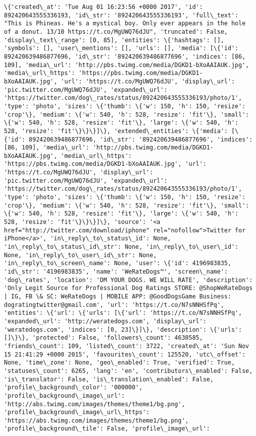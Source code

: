 \documentclass[11pt]{article}
\begin{document}
    \begin{Verbatim}[commandchars=\\\{\}]
\{'created\_at': 'Tue Aug 01 16:23:56 +0000 2017', 'id': 892420643555336193, 'id\_str': '892420643555336193', 'full\_text': "This is Phineas. He's a mystical boy. Only ever appears in the hole of a donut. 13/10 https://t.co/MgUWQ76dJU", 'truncated': False, 'display\_text\_range': [0, 85], 'entities': \{'hashtags': [], 'symbols': [], 'user\_mentions': [], 'urls': [], 'media': [\{'id': 892420639486877696, 'id\_str': '892420639486877696', 'indices': [86, 109], 'media\_url': 'http://pbs.twimg.com/media/DGKD1-bXoAAIAUK.jpg', 'media\_url\_https': 'https://pbs.twimg.com/media/DGKD1-bXoAAIAUK.jpg', 'url': 'https://t.co/MgUWQ76dJU', 'display\_url': 'pic.twitter.com/MgUWQ76dJU', 'expanded\_url': 'https://twitter.com/dog\_rates/status/892420643555336193/photo/1', 'type': 'photo', 'sizes': \{'thumb': \{'w': 150, 'h': 150, 'resize': 'crop'\}, 'medium': \{'w': 540, 'h': 528, 'resize': 'fit'\}, 'small': \{'w': 540, 'h': 528, 'resize': 'fit'\}, 'large': \{'w': 540, 'h': 528, 'resize': 'fit'\}\}\}]\}, 'extended\_entities': \{'media': [\{'id': 892420639486877696, 'id\_str': '892420639486877696', 'indices': [86, 109], 'media\_url': 'http://pbs.twimg.com/media/DGKD1-bXoAAIAUK.jpg', 'media\_url\_https': 'https://pbs.twimg.com/media/DGKD1-bXoAAIAUK.jpg', 'url': 'https://t.co/MgUWQ76dJU', 'display\_url': 'pic.twitter.com/MgUWQ76dJU', 'expanded\_url': 'https://twitter.com/dog\_rates/status/892420643555336193/photo/1', 'type': 'photo', 'sizes': \{'thumb': \{'w': 150, 'h': 150, 'resize': 'crop'\}, 'medium': \{'w': 540, 'h': 528, 'resize': 'fit'\}, 'small': \{'w': 540, 'h': 528, 'resize': 'fit'\}, 'large': \{'w': 540, 'h': 528, 'resize': 'fit'\}\}\}]\}, 'source': '<a href="http://twitter.com/download/iphone" rel="nofollow">Twitter for iPhone</a>', 'in\_reply\_to\_status\_id': None, 'in\_reply\_to\_status\_id\_str': None, 'in\_reply\_to\_user\_id': None, 'in\_reply\_to\_user\_id\_str': None, 'in\_reply\_to\_screen\_name': None, 'user': \{'id': 4196983835, 'id\_str': '4196983835', 'name': 'WeRateDogs™', 'screen\_name': 'dog\_rates', 'location': 'DM YOUR DOGS. WE WILL RATE', 'description': 'Only Legit Source for Professional Dog Ratings STORE: @ShopWeRateDogs | IG, FB \& SC: WeRateDogs | MOBILE APP: @GoodDogsGame Business: dogratingtwitter@gmail.com', 'url': 'https://t.co/N7sNNHSfPq', 'entities': \{'url': \{'urls': [\{'url': 'https://t.co/N7sNNHSfPq', 'expanded\_url': 'http://weratedogs.com', 'display\_url': 'weratedogs.com', 'indices': [0, 23]\}]\}, 'description': \{'urls': []\}\}, 'protected': False, 'followers\_count': 4630585, 'friends\_count': 109, 'listed\_count': 3722, 'created\_at': 'Sun Nov 15 21:41:29 +0000 2015', 'favourites\_count': 125520, 'utc\_offset': None, 'time\_zone': None, 'geo\_enabled': True, 'verified': True, 'statuses\_count': 6265, 'lang': 'en', 'contributors\_enabled': False, 'is\_translator': False, 'is\_translation\_enabled': False, 'profile\_background\_color': '000000', 'profile\_background\_image\_url': 'http://abs.twimg.com/images/themes/theme1/bg.png', 'profile\_background\_image\_url\_https': 'https://abs.twimg.com/images/themes/theme1/bg.png', 'profile\_background\_tile': False, 'profile\_image\_url': 
\end{Verbatim}
\end{document}
